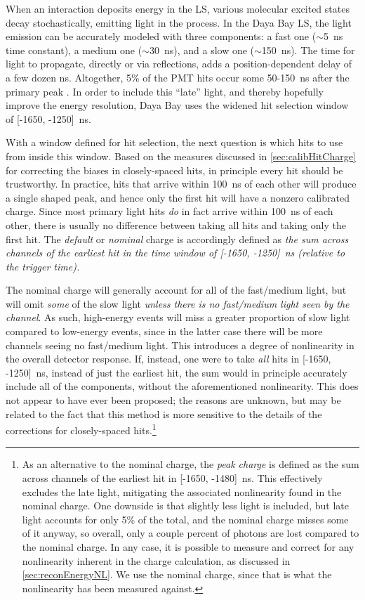 \documentclass[../thesis.tex]{subfiles}
\begin{document}
When an interaction deposits energy in the LS, various molecular excited states decay stochastically, emitting light in the process. In the Daya Bay LS, the light emission can be accurately modeled with three components: a fast one ($\sim$5~ns time constant), a medium one ($\sim$30~ns), and a slow one ($\sim$150~ns). The time for light to propagate, directly or via reflections, adds a position-dependent delay of a few dozen ns. Altogether, 5\% of the PMT hits occur some 50-150~ns after the primary peak \cite{peakCharge}. In order to include this ``late'' light, and thereby hopefully improve the energy resolution, Daya Bay uses the widened hit selection window of [-1650, -1250]~ns.

With a window defined for hit selection, the next question is which hits to use from inside this window. Based on the measures discussed in \autoref{sec:calibHitCharge} for correcting the biases in closely-spaced hits, in principle every hit should be trustworthy. In practice, hits that arrive within 100~ns of each other will produce a single shaped peak, and hence only the first hit will have a nonzero calibrated charge. Since most primary light hits \emph{do} in fact arrive within 100~ns of each other, there is usually no difference between taking all hits and taking only the first hit. The \emph{default} or \emph{nominal} charge is accordingly defined as \emph{the sum across channels of the earliest hit in the time window of [-1650, -1250]~ns (relative to the trigger time).}

The nominal charge will generally account for all of the fast/medium light, but will omit \emph{some} of the slow light \emph{unless there is no fast/medium light seen by the channel}. As such, high-energy events will miss a greater proportion of slow light compared to low-energy events, since in the latter case there will be more channels seeing no fast/medium light. This introduces a degree of nonlinearity in the overall detector response. If, instead, one were to take \emph{all} hits in [-1650, -1250]~ns, instead of just the earliest hit, the sum would in principle accurately include all of the components, without the aforementioned nonlinearity. This does not appear to have ever been proposed; the reasons are unknown, but may be related to the fact that this method is more sensitive to the details of the corrections for closely-spaced hits.\footnote{%
As an alternative to the nominal charge, the \emph{peak charge} is defined as the sum across channels of the earliest hit in [-1650, -1480]~ns. This effectively excludes the late light, mitigating the associated nonlinearity found in the nominal charge. One downside is that slightly less light is included, but late light accounts for only 5\% of the total, and the nominal charge misses some of it anyway, so overall, only a couple percent of photons are lost compared to the nominal charge. In any case, it is possible to measure and correct for any nonlinearity inherent in the charge calculation, as discussed in \autoref{sec:reconEnergyNL}. We use the nominal charge, since that is what the nonlinearity has been measured against.%
}
\end{document}
